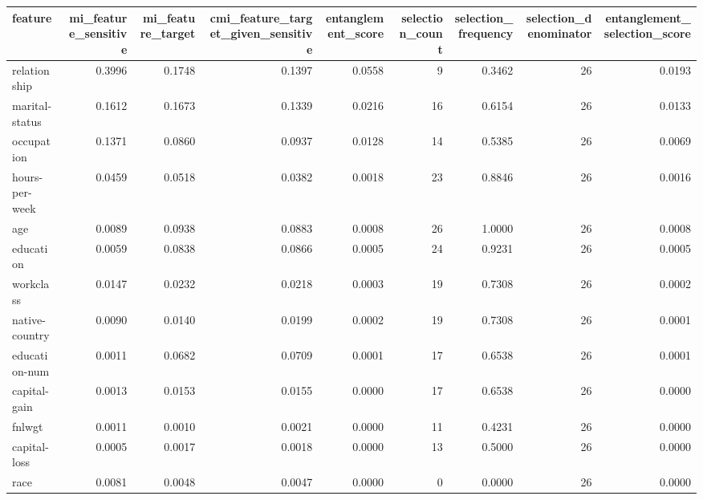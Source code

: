 \begin{tabular}{lrrrrrrrr}
\toprule
feature & mi\_feature\_sensitive & mi\_feature\_target & cmi\_feature\_target\_given\_sensitive & entanglement\_score & selection\_count & selection\_frequency & selection\_denominator & entanglement\_selection\_score \\
\midrule
relationship & 0.3996 & 0.1748 & 0.1397 & 0.0558 & 9 & 0.3462 & 26 & 0.0193 \\
marital-status & 0.1612 & 0.1673 & 0.1339 & 0.0216 & 16 & 0.6154 & 26 & 0.0133 \\
occupation & 0.1371 & 0.0860 & 0.0937 & 0.0128 & 14 & 0.5385 & 26 & 0.0069 \\
hours-per-week & 0.0459 & 0.0518 & 0.0382 & 0.0018 & 23 & 0.8846 & 26 & 0.0016 \\
age & 0.0089 & 0.0938 & 0.0883 & 0.0008 & 26 & 1.0000 & 26 & 0.0008 \\
education & 0.0059 & 0.0838 & 0.0866 & 0.0005 & 24 & 0.9231 & 26 & 0.0005 \\
workclass & 0.0147 & 0.0232 & 0.0218 & 0.0003 & 19 & 0.7308 & 26 & 0.0002 \\
native-country & 0.0090 & 0.0140 & 0.0199 & 0.0002 & 19 & 0.7308 & 26 & 0.0001 \\
education-num & 0.0011 & 0.0682 & 0.0709 & 0.0001 & 17 & 0.6538 & 26 & 0.0001 \\
capital-gain & 0.0013 & 0.0153 & 0.0155 & 0.0000 & 17 & 0.6538 & 26 & 0.0000 \\
fnlwgt & 0.0011 & 0.0010 & 0.0021 & 0.0000 & 11 & 0.4231 & 26 & 0.0000 \\
capital-loss & 0.0005 & 0.0017 & 0.0018 & 0.0000 & 13 & 0.5000 & 26 & 0.0000 \\
race & 0.0081 & 0.0048 & 0.0047 & 0.0000 & 0 & 0.0000 & 26 & 0.0000 \\
\bottomrule
\end{tabular}
